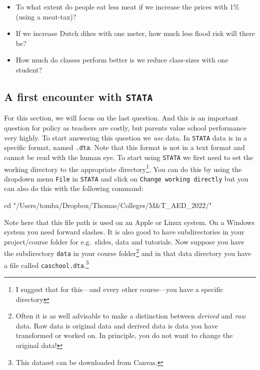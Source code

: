\documentclass[
]{book}
\newenvironment{Shaded}{\begin{snugshade}}{\end{snugshade}}
\newcommand{\NormalTok}[1]{#1}
\newcommand{\StringTok}[1]{\textcolor[rgb]{0.31,0.60,0.02}{#1}}
\providecommand{\tightlist}{%
  \setlength{\itemsep}{0pt}\setlength{\parskip}{0pt}}
\begin{document}
\begin{itemize}
\tightlist
\item
  To what extent do people eat less meat if we increase the prices with 1\% (using a meat-tax)?
\item
  If we increase Dutch dikes with one meter, how much less flood risk will there be?
\item
  How much do classes perform better is we reduce class-sizes with one student?
\end{itemize}

\hypertarget{a-first-encounter-with-stata}{%
\subsection{\texorpdfstring{A first encounter with \texttt{STATA}}{A first encounter with STATA}}\label{a-first-encounter-with-stata}}

For this section, we will focus on the last question. And this is an important question for policy as teachers are costly, but parents value school performance very highly. To start answering this question we \emph{use} data. In \texttt{STATA} data is in a specific format, named \texttt{.dta}. Note that this format is not in a text format and cannot be read with the human eye. To start using \texttt{STATA} we first need to set the working directory to the appropriate directory\footnote{I suggest that for this---and every other course---you have a specific directory}. You can do this by using the dropdown menu \texttt{File} in \texttt{STATA} and click on \texttt{Change\ working\ directly} but you can also do this with the following command:

\begin{Shaded}
\begin{Highlighting}[]
\NormalTok{cd  }\StringTok{"/Users/tomba/Dropbox/Thomas/Colleges/M\&T\_AED\_2022/"}
\end{Highlighting}
\end{Shaded}

Note here that this file path is used on an Apple or Linux system. On a Windows system you need forward slashes. It is also good to have subdirectories in your project/course folder for e.g.~slides, data and tutorials. Now suppose you have the subdirectory \texttt{data} in your course folder\footnote{Often it is as well advisable to make a distinction between \emph{derived} and \emph{raw} data. Raw data is original data and derived data is data you have transformed or worked on. In principle, you do not want to change the original data!} and in that data directory you have a file called \texttt{caschool.dta}.\footnote{This dataset can be downloaded from Canvas.}
\end{document}
